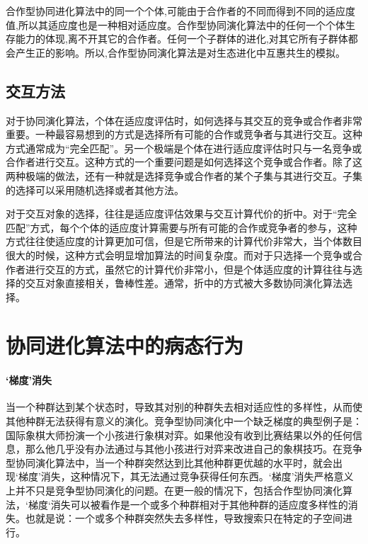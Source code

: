 \documentclass[a4paper]{article}
\begin{document}
    合作型协同进化算法中的同一个个体,可能由于合作者的不同而得到不同的适应度值,所以其适应度也是一种相对适应度。合作型协同演化算法中的任何一个个体生存能力的体现,离不开其它的合作者。任何一个子群体的进化,对其它所有子群体都会产生正的影响。所以,合作型协同演化算法是对生态进化中互惠共生的模拟。

    \subsection{交互方法}
    
    对于协同演化算法，个体在适应度评估时，如何选择与其交互的竞争或合作者非常重要。一种最容易想到的方式是选择所有可能的合作或竞争者与其进行交互。这种方式通常成为“完全匹配”。另一个极端是个体在进行适应度评估时只与一名竞争或合作者进行交互。这种方式的一个重要问题是如何选择这个竞争或合作者。除了这两种极端的做法，还有一种就是选择竞争或合作者的某个子集与其进行交互。子集的选择可以采用随机选择或者其他方法。

    对于交互对象的选择，往往是适应度评估效果与交互计算代价的折中。对于“完全匹配”方式，每个个体的适应度计算需要与所有可能的合作或竞争者的参与，这种方式往往使适应度的计算更加可信，但是它所带来的计算代价非常大，当个体数目很大的时候，这种方式会明显增加算法的时间复杂度。而对于只选择一个竞争或合作者进行交互的方式，虽然它的计算代价非常小，但是个体适应度的计算往往与选择的交互对象直接相关，鲁棒性差。通常，折中的方式被大多数协同演化算法选择。

    \newpage
    \section{协同进化算法中的病态行为}

    \paragraph{‘梯度’消失}

    当一个种群达到某个状态时，导致其对别的种群失去相对适应性的多样性，从而使其他种群无法获得有意义的演化。竞争型协同演化中一个缺乏梯度的典型例子是：国际象棋大师扮演一个小孩进行象棋对弈。如果他没有收到比赛结果以外的任何信息，那么他几乎没有办法通过与其他小孩进行对弈来改进自己的象棋技巧。在竞争型协同演化算法中，当一个种群突然达到比其他种群更优越的水平时，就会出现‘梯度’消失，这种情况下，其无法通过竞争获得任何东西。‘梯度’消失严格意义上并不只是竞争型协同演化的问题。在更一般的情况下，包括合作型协同演化算法，‘梯度‘消失可以被看作是一个或多个种群相对于其他种群的适应度多样性的消失。也就是说：一个或多个种群突然失去多样性，导致搜索只在特定的子空间进行。
\end{document}

